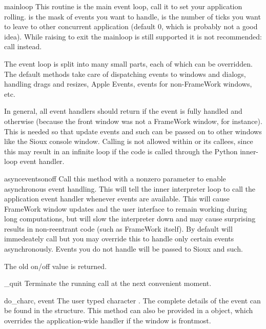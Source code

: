 \begin{methoddesc}[Application]{mainloop}{}
This routine is the main event loop, call it to set your application
rolling.  is the mask of events you want to handle,
 is the number of ticks you want to leave to other
concurrent application (default 0, which is probably not a good
idea). While raising  to exit the mainloop is still
supported it is not recommended: call  instead.

The event loop is split into many small parts, each of which can be
overridden. The default methods take care of dispatching events to
windows and dialogs, handling drags and resizes, Apple Events, events
for non-FrameWork windows, etc.

In general, all event handlers should return  if the event is fully
handled and  otherwise (because the front window was not a FrameWork
window, for instance). This is needed so that update events and such
can be passed on to other windows like the Sioux console window.
Calling  is not allowed within
 or its callees, since this may result in an
infinite loop if the code is called through the Python inner-loop
event handler.
\end{methoddesc}

\begin{methoddesc}[Application]{asyncevents}{onoff}
Call this method with a nonzero parameter to enable
asynchronous event handling. This will tell the inner interpreter loop
to call the application event handler  whenever events
are available. This will cause FrameWork window updates and the user
interface to remain working during long computations, but will slow the
interpreter down and may cause surprising results in non-reentrant code
(such as FrameWork itself). By default  will immedeately
call  but you may override this to handle only certain
events asynchronously. Events you do not handle will be passed to Sioux
and such.

The old on/off value is returned.
\end{methoddesc}

\begin{methoddesc}[Application]{_quit}{}
Terminate the running  call at the next convenient
moment.
\end{methoddesc}

\begin{methoddesc}[Application]{do_char}{c, event}
The user typed character . The complete details of the event
can be found in the  structure. This method can also be
provided in a  object, which overrides the
application-wide handler if the window is frontmost.
\end{methoddesc}

